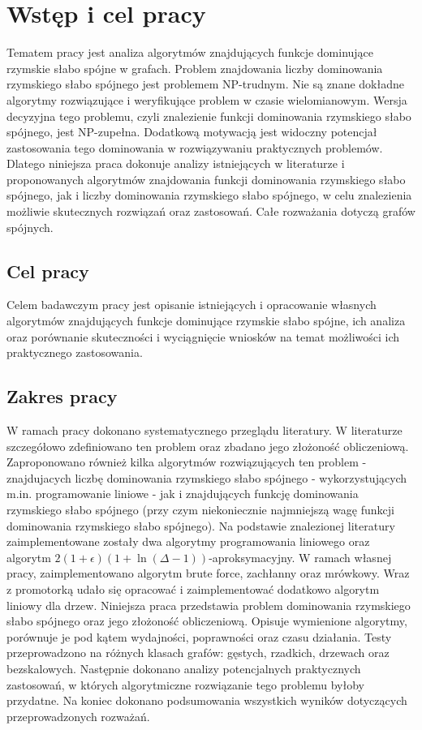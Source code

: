 \chapter{Wstęp i cel pracy}
Tematem pracy jest analiza algorytmów znajdujących funkcje dominujące rzymskie słabo spójne w grafach.
Problem znajdowania liczby dominowania rzymskiego słabo spójnego jest problemem NP-trudnym. Nie są znane dokładne algorytmy rozwiązujące i weryfikujące problem w czasie wielomianowym. Wersja decyzyjna tego problemu, czyli znalezienie funkcji dominowania rzymskiego słabo spójnego, jest NP-zupełna. Dodatkową motywacją jest widoczny potencjał zastosowania tego dominowania w rozwiązywaniu praktycznych problemów. Dlatego niniejsza praca dokonuje analizy istniejących w literaturze i proponowanych algorytmów znajdowania funkcji dominowania rzymskiego słabo spójnego, jak i liczby dominowania rzymskiego słabo spójnego, w celu znalezienia możliwie skutecznych rozwiązań oraz zastosowań. Całe rozważania dotyczą grafów spójnych.

\section{Cel pracy}
Celem badawczym pracy jest opisanie istniejących i opracowanie własnych algorytmów znajdujących funkcje dominujące rzymskie słabo spójne, ich analiza oraz porównanie skuteczności i wyciągnięcie wniosków na temat możliwości ich praktycznego zastosowania.

\section{Zakres pracy}
W ramach pracy dokonano systematycznego przeglądu literatury. W literaturze szczegółowo zdefiniowano ten problem oraz zbadano jego złożoność obliczeniową. Zaproponowano również kilka algorytmów rozwiązujących ten problem - znajdujacych liczbę dominowania rzymskiego słabo spójnego - wykorzystujących m.in. programowanie liniowe - jak i znajdujących funkcję dominowania rzymskiego słabo spójnego (przy czym niekoniecznie najmniejszą wagę funkcji dominowania rzymskiego słabo spójnego). Na podstawie znalezionej literatury zaimplementowane zostały dwa algorytmy programowania liniowego oraz algorytm $2(1+\epsilon)(1 + \ln(\Delta - 1))$-aproksymacyjny. W ramach własnej pracy, zaimplementowano algorytm brute force, zachłanny oraz mrówkowy. Wraz z promotorką udało się opracować i zaimplementować dodatkowo algorytm liniowy dla drzew. Niniejsza praca przedstawia problem dominowania rzymskiego słabo spójnego oraz jego złożoność obliczeniową. Opisuje wymienione algorytmy, porównuje je pod kątem wydajności, poprawności oraz czasu działania. Testy przeprowadzono na różnych klasach grafów: gęstych, rzadkich, drzewach oraz bezskalowych. Następnie dokonano analizy potencjalnych praktycznych zastosowań, w których algorytmiczne rozwiązanie tego problemu byłoby przydatne. Na koniec dokonano podsumowania wszystkich wyników dotyczących przeprowadzonych rozważań.